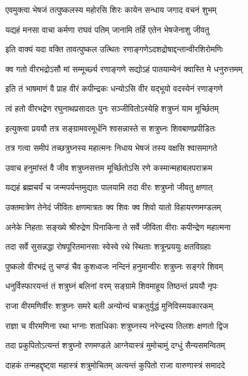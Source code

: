 \twolineshloka
{एवमुक्त्वा भेषजं तत्पुष्कलस्य महोरसि}
{शिरः कायेन सन्धाय जगाद वचनं शुभम्}%

\twolineshloka
{यद्यहं मनसा वाचा कर्मणा राघवं पतिम्}
{जानामि तर्हि एतेन भेषजेनाशु जीवतु}%

\twolineshloka
{इति वाक्यं यदा वक्ति तावत्पुष्कल उत्थितः}
{रणाङ्गणेऽदशद्रोषाद्दन्तान्वीरशिरोमणिः}%

\twolineshloka
{क्व गतो वीरभद्रोऽसौ मां सम्मूर्च्छ्य रणाङ्गणे}
{सद्योऽहं पातयाम्येनं क्वास्ति मे धनुरुत्तमम्}%

\twolineshloka
{इति तं भाषमाणं वै प्राह वीरं कपीन्द्रकः}
{धन्योऽसि वीर यद्भूयो वदस्येनं रणाङ्गणे}%

\twolineshloka
{त्वं हतो वीरभद्रेण रघुनाथप्रसादतः}
{पुनः सञ्जीवितोऽस्येहि शत्रुघ्नं याम मूर्च्छितम्}%

\twolineshloka
{इत्युक्त्वा प्रययौ तत्र सङ्ग्रामवरमूर्धनि}
{श्वसन्नास्ते स शत्रुघ्नः शिवबाणप्रपीडितः}%

\twolineshloka
{तत्र गत्वा समीपं तच्छत्रुघ्नस्य महात्मनः}
{निधाय भेषजं तस्य वक्षसि श्वासमागते}%

\twolineshloka
{उवाच हनुमांस्तं वै जीव शत्रुघ्नसत्तम}
{मूर्च्छितोऽसि रणे कस्मान्महाबलपराक्रम}%

\twolineshloka
{यद्यहं ब्रह्मचर्यं च जन्मपर्यन्तमुद्यतः}
{पालयामि तदा वीरः शत्रुघ्नो जीवतु क्षणात्}%

\twolineshloka
{उक्तमात्रेण तेनेदं जीवितः क्षणमात्रतः}
{क्व शिवः क्व शिवो यातो विहायरणमण्डलम्}%

\twolineshloka
{अनेके निहताः सङ्ख्ये श्रीरुद्रेण पिनाकिना}
{ते सर्वे जीविता वीराः कपीन्द्रेण महात्मना}%

\twolineshloka
{तदा सर्वे सुसन्नद्धा रोषपूरितमानसाः}
{स्वेस्वे रथे स्थिताः शत्रून्प्रययुः क्षतविग्रहाः}%

\twolineshloka
{पुष्कलो वीरभद्रं तु चण्डं चैव कुशध्वजः}
{नन्दिनं हनुमान्वीरः शत्रुघ्नः सङ्गरे शिवम्}%

\twolineshloka
{धनुर्विस्फारयन्तं तं शत्रुघ्नं बलिनां वरम्}
{सङ्ग्रामे शिवमाहूय तिष्ठन्तं प्रययौ नृपः}%

\twolineshloka
{राजा वीरमणिर्वीरः शत्रुघ्नः समरे बली}
{अन्योन्यं चक्रतुर्युद्धं मुनिविस्मयकारकम्}%

\twolineshloka
{राज्ञा च वीरमणिना रथा भग्नाः शताधिकाः}
{शत्रुघ्नस्य नरेन्द्रस्य तिलशः क्षणतो द्विज}%

\twolineshloka
{तदा प्रकुपितोऽत्यन्तं शत्रुघ्नो रणमण्डले}
{आग्नेयास्त्रं मुमोचामुं दग्धुं सैन्यसमन्वितम्}%

\twolineshloka
{दाहकं तन्महद्दृष्ट्वा महास्त्रं शत्रुमोचितम्}
{अत्यन्तं कुपितो राजा वारुणास्त्रं समाददे}%

